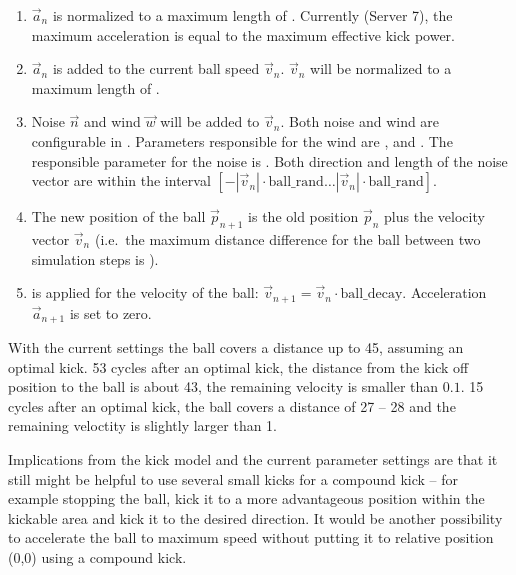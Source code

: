 \begin{enumerate}
\item $\vec{a}_{n}$ is normalized to a maximum length of
  . Currently (Server 7), the maximum acceleration
  is equal to the maximum effective kick power. 
\item $\vec{a}_{n}$ is added to the current ball speed $\vec{v}_{n}$.
  $\vec{v}_{n}$ will be normalized to a maximum length of
  .
\item Noise $\vec{n}$ and wind $\vec{w}$ will be added to
  $\vec{v}_{n}$. Both noise and wind are configurable in
  . Parameters responsible for the wind are
  ,  and
  . The responsible parameter for the noise
  is . Both direction and length
  of the noise vector are within the interval $[ -|\vec{v}_{n}| \cdot
  \mathrm{ball\_rand} \ldots |\vec{v}_{n}| \cdot \mathrm{ball\_rand}]$.  
\item The new position of the ball $\vec{p}_{n+1}$ is the old position
  $\vec{p}_{n}$ plus the velocity vector $\vec{v}_{n}$ (i.e.\ the maximum
  distance difference for the ball between two simulation steps is 
  ).
\item {} is applied for the velocity of the ball:
  $\vec{v}_{n+1} = \vec{v}_{n} \cdot \mathrm{ball\_decay}$.
  Acceleration $\vec{a}_{n+1}$ is set to zero.
\end{enumerate}

With the current settings the ball covers a distance up to 45, assuming
an optimal kick. 53 cycles after an optimal kick, the distance from the 
kick off position to the ball is about 43, the remaining velocity is smaller 
than $0.1$. 15 cycles after an optimal kick, the ball covers a distance of 
27 -- 28 and the remaining veloctity is slightly larger than 1. 

Implications from the kick model and the current parameter settings are 
that it still might be helpful to use several small kicks for a compound 
kick -- for example stopping the ball, kick it to a more advantageous 
position within the kickable area and kick it to the desired direction.
It would be another possibility to accelerate the ball to maximum speed
without putting it to relative position (0,0{\textdegree}) using a 
compound kick. 

